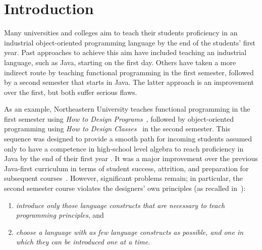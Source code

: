 \documentclass[submission,copyright]{eptcs}
\title{\thetitle}
\author{Sam Tobin-Hochstadt \quad\qquad David Van Horn
\institute{Northeastern University\\
Boston, Massachusetts, USA}
\email{\{samth,dvanhorn\}@ccs.neu.edu}
}
\begin{document}
\maketitle

\begin{abstract}
We propose a bridge between functional and object-oriented programming
in the first-year curriculum.  Traditionally, curricula that begin
with functional programming transition to a professional, usually
object-oriented, language in the second course.  This transition poses
numerous obstacles to students, and often results in confusing the
details of development environments, syntax, and libraries with the
fundamentals that the course focuses on.  Our proposal instead begins
the second course with a sequence of custom teaching languages which
minimize the transition from the first course, and allow students to
focus on the core ideas.  We then transition to Java half-way through
the course, at which point students have a strong command of the basic
ideas.  We have 3 years of experience with this course, and it has
produced notable success.
\end{abstract}

\section{Introduction}
\label{sec:intro}

Many universities and colleges aim to teach their students proficiency
in an industrial object-oriented programming language by the end of
the students' first year.  Past approaches to achieve this aim have
included teaching an industrial language, such as Java, starting on
the first day.  Others have taken a more indirect route by teaching
functional programming in the first semester, followed by a second
semester that starts in Java.  The latter approach is an improvement
over the first, but both suffer serious flaws.

As an example, Northeastern University teaches functional programming
in the first semester using \emph{How to Design
  Programs}~\cite{dvanhorn:Felleisen2001How}, followed by
object-oriented programming using \emph{How to Design
  Classes}~\cite{local:htdc} in the second semester.  This sequence
was designed to provide a smooth path for incoming students assumed
only to have a competence in high-school level algebra to reach
proficiency in Java by the end of their first year
\cite{dvanhorn:Felleisen2004Structure}.  It was a major improvement
over the previous Java-first curriculum in terms of student success,
attrition, and preparation for subsequent
courses~\cite{dvanhorn:Proulx2006Design}.  However, significant
problems remain; in particular, the second semester course violates
the designers' own principles (as recalled
in~\cite{dvanhorn:Bloch2000Scheme}):
%
\begin{enumerate}
\item \emph{introduce only those language constructs that are necessary to
  teach programming principles}, and
\item \emph{choose a language with as
  few language constructs as possible, and one in which they can be
  introduced one at a time}.
\end{enumerate}
\end{document}
